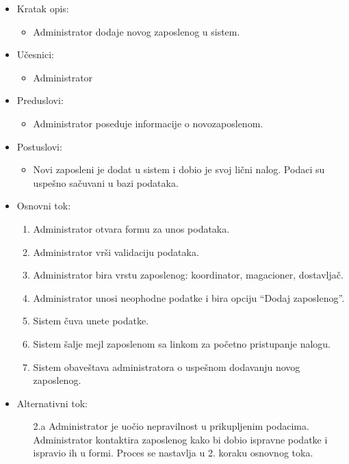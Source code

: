 
\begin{itemize}
    \item Kratak opis:
        \begin{itemize}
            \item Administrator dodaje novog zaposlenog u sistem.
        \end{itemize}
    \item Učesnici:
        \begin{itemize}
            \item Administrator
        \end{itemize}
    \item Preduslovi:
        \begin{itemize}
            \item Administrator poseduje informacije o novozaposlenom.
        \end{itemize}
    \item Postuslovi:
        \begin{itemize}
            \item Novi zaposleni je dodat u sistem i dobio je svoj lični nalog. Podaci su uspešno sačuvani u bazi podataka.
        \end{itemize}
    \item Osnovni tok:
        \begin{enumerate}
         \item Administrator otvara formu za unos podataka.
         \item Administrator vrši validaciju podataka.
         \item Administrator bira vrstu zaposlenog: koordinator, magacioner, dostavljač.
         \item Administrator unosi neophodne podatke i bira opciju ``Dodaj zaposlenog''.
         \item Sistem čuva unete podatke.
         \item Sistem šalje mejl zaposlenom sa linkom za početno pristupanje nalogu.
         \item Sistem obaveštava administratora o uspešnom dodavanju novog zaposlenog.
        \end{enumerate}
    \item Alternativni tok:
        \begin{itemize}
            \item[2.a] Administrator je uočio nepravilnost u prikupljenim podacima. Administrator kontaktira zaposlenog kako bi dobio ispravne podatke i ispravio ih u formi. Proces se nastavlja u 2. koraku osnovnog toka.

\end{itemize}
\end{itemize}
